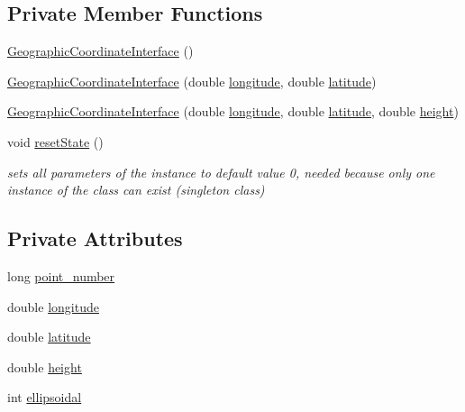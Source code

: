 \subsection*{Private Member Functions}
\begin{DoxyCompactItemize}
\item 
\hyperlink{classcoordinates_1_1_geographic_coordinate_interface_a99505d4e0e605d32d8cfc6c5a631eed4}{Geographic\+Coordinate\+Interface} ()
\item 
\hyperlink{classcoordinates_1_1_geographic_coordinate_interface_a52a34d3fd3e4b664da7ea64a6b9c5f80}{Geographic\+Coordinate\+Interface} (double \hyperlink{classcoordinates_1_1_geographic_coordinate_interface_ae82d3ae4819bc8e243ca54f6568ec005}{longitude}, double \hyperlink{classcoordinates_1_1_geographic_coordinate_interface_a80705d81d2b4631d1ac928f703715d0c}{latitude})
\item 
\hyperlink{classcoordinates_1_1_geographic_coordinate_interface_a3ab0e13cfbc6c8dd266f63d74464354c}{Geographic\+Coordinate\+Interface} (double \hyperlink{classcoordinates_1_1_geographic_coordinate_interface_ae82d3ae4819bc8e243ca54f6568ec005}{longitude}, double \hyperlink{classcoordinates_1_1_geographic_coordinate_interface_a80705d81d2b4631d1ac928f703715d0c}{latitude}, double \hyperlink{classcoordinates_1_1_geographic_coordinate_interface_a172154f497767cdc832c1a851552bd8b}{height})
\item 
void \hyperlink{classcoordinates_1_1_geographic_coordinate_interface_a9a5372c4b3b53a601a047a4de276a591}{reset\+State} ()
\begin{DoxyCompactList}\small\item\em sets all parameters of the instance to default value 0, needed because only one instance of the class can exist (singleton class) \end{DoxyCompactList}\end{DoxyCompactItemize}
\subsection*{Private Attributes}
\begin{DoxyCompactItemize}
\item 
long \hyperlink{classcoordinates_1_1_geographic_coordinate_interface_abfad220dc359597518b9f199be6b957a}{point\+\_\+number}
\item 
double \hyperlink{classcoordinates_1_1_geographic_coordinate_interface_ae82d3ae4819bc8e243ca54f6568ec005}{longitude}
\item 
double \hyperlink{classcoordinates_1_1_geographic_coordinate_interface_a80705d81d2b4631d1ac928f703715d0c}{latitude}
\item 
double \hyperlink{classcoordinates_1_1_geographic_coordinate_interface_a172154f497767cdc832c1a851552bd8b}{height}
\item 
int \hyperlink{classcoordinates_1_1_geographic_coordinate_interface_a9e462122f55a06ade4c805d389e432f2}{ellipsoidal}
\end{DoxyCompactItemize}
